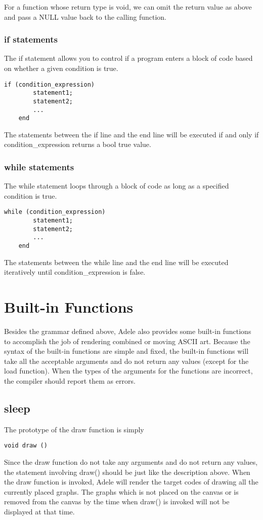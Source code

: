 \documentclass[11pt,letterpaper]{article}
\begin{document}
For a function whose return type is void, we can omit the return value as above and pass a NULL value back to the calling function.


\subsubsection {if statements}
The if statement allows you to control if a program enters a block of code based on whether a given condition is true. 

\begin{lstlisting}[tabsize=4]
	if (condition_expression)
   		statement1;
   		statement2;
		...
	end
\end{lstlisting}

The statements between the if line and the end line will be executed if and only if condition\_expression returns a bool true value.

\subsubsection {while statements}
The while statement loops through a block of code as long as a specified condition is true.

\begin{lstlisting}[tabsize=4]
	while (condition_expression)
   		statement1;
	   	statement2;
		...
	end
\end{lstlisting}

The statements between the while line and the end line will be executed iteratively until condition\_expression is false.

\section {Built-in Functions}
Besides the grammar defined above, Adele also provides some built-in functions to accomplish the job of rendering combined or moving ASCII art. Because the syntax of the built-in functions are simple and fixed, the built-in functions will take all the acceptable arguments and do not return any values (except for the load function). When the types of the arguments for the functions are incorrect, the compiler should report them as errors.

\subsection {sleep}
The prototype of the draw function is simply
\begin{lstlisting}[tabsize=4]
	void draw ()
\end{lstlisting}
Since the draw function do not take any arguments and do not return any values, the statement involving draw() should be just like the description above. When the draw function is invoked, Adele will render the target codes of drawing all the currently placed graphs. The graphs which is not placed on the canvas or is removed from the canvas by the time when draw() is invoked will not be displayed at that time.
\end{document}
